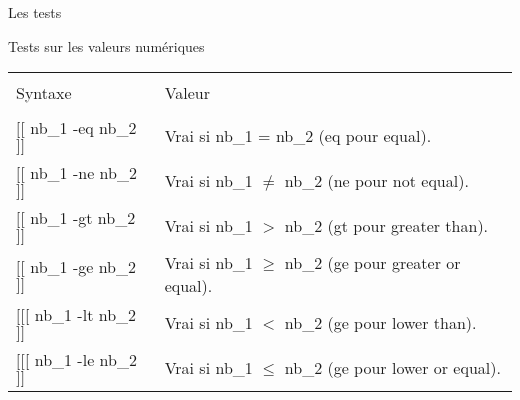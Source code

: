 \begin{frame}{Les tests}
	\begin{block}{Tests sur les valeurs numériques}
		\begin{center}
			\begin{tabular}{ll}
				\hline\\
				Syntaxe&Valeur\\
				\hline\\
				$[[$ nb\_1 -eq nb\_2 $]]$&Vrai si nb\_1 = nb\_2 (eq pour equal).\\[2pt]
				$[[$ nb\_1 -ne nb\_2 $]]$&Vrai si nb\_1 $\neq$ nb\_2 (ne pour not equal).\\[2pt]
				$[[$ nb\_1 -gt nb\_2 $]]$&Vrai si nb\_1 $>$ nb\_2 (gt pour greater than).\\[2pt]
				$[[$ nb\_1 -ge nb\_2 $]]$&Vrai si nb\_1 $\geq$ nb\_2 (ge pour greater or equal).\\[2pt]
				$[[$[ nb\_1 -lt nb\_2 $]]$&Vrai si nb\_1 $<$ nb\_2 (ge pour lower than).\\[2pt]
				$[[$[ nb\_1 -le nb\_2 $]]$&Vrai si nb\_1 $\leq$ nb\_2 (ge pour lower or equal).\\[2pt]
				\hline
			\end{tabular}
		\end{center}
	\end{block}

\end{frame}
